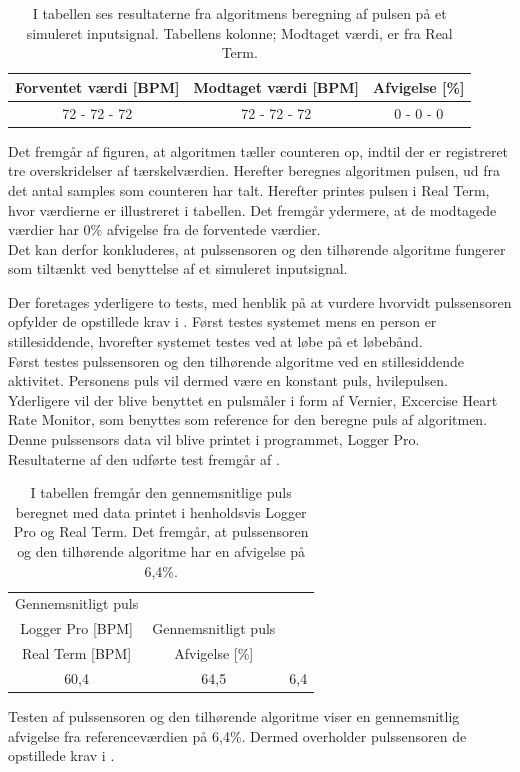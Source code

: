 \begin{table}[H]
	\centering
	\begin{tabular}{ccc}
		\hline
		\rowcolor[HTML]{C0C0C0} 
		Forventet værdi [BPM] & Modtaget værdi [BPM] & Afvigelse [\%]\\ \hline
		72 - 72 - 72          & 72 - 72 - 72         & 0 - 0 - 0 \\ \hline
	\end{tabular}
	\caption{I tabellen ses resultaterne fra algoritmens beregning af pulsen på et simuleret inputsignal. Tabellens kolonne; Modtaget værdi, er fra Real Term.}
	\label{tab:test_puls_realterm}
\end{table} \vspace{-0.5cm}

Det fremgår af figuren, at algoritmen tæller counteren op, indtil der er registreret tre overskridelser af tærskelværdien. Herefter beregnes algoritmen pulsen, ud fra det antal samples som counteren har talt. Herefter printes pulsen i Real Term, hvor værdierne er illustreret i tabellen. Det fremgår ydermere, at de modtagede værdier har 0\% afvigelse fra de forventede værdier. \\
Det kan derfor konkluderes, at pulssensoren og den tilhørende algoritme fungerer som tiltænkt ved benyttelse af et simuleret inputsignal. 

Der foretages yderligere to tests, med henblik på at vurdere hvorvidt pulssensoren opfylder de opstillede krav i . Først testes systemet mens en person er stillesiddende, hvorefter systemet testes ved at løbe på et løbebånd. \\
Først testes pulssensoren og den tilhørende algoritme ved en stillesiddende aktivitet. Personens puls vil dermed være en konstant puls, hvilepulsen. Yderligere vil der blive benyttet en pulsmåler i form af Vernier, Excercise Heart Rate Monitor, som benyttes som reference for den beregne puls af algoritmen. Denne pulssensors data vil blive printet i programmet, Logger Pro. \\
Resultaterne af den udførte test fremgår af .

\begin{table}[H]
	\centering
	\begin{tabular}{ccc}
		\hline
		\rowcolor[HTML]{C0C0C0} 
		Gennemsnitligt puls \\ Logger Pro [BPM] & Gennemsnitligt puls \\ Real Term [BPM] & Afvigelse [\%]\\ \hline
		60,4         & 64,5         & 6,4 \\ \hline
	\end{tabular}
	\caption{I tabellen fremgår den gennemsnitlige puls beregnet med data printet i henholdsvis Logger Pro og Real Term. Det fremgår, at pulssensoren og den tilhørende algoritme har en afvigelse på 6,4\%.}
	\label{tab:test_pulssystem}
\end{table} \vspace{-0.5cm}

Testen af pulssensoren og den tilhørende algoritme viser en gennemsnitlig afvigelse fra referenceværdien på 6,4\%. Dermed overholder pulssensoren de opstillede krav i .




